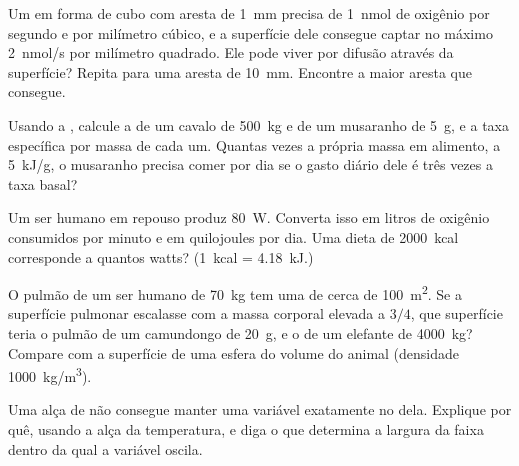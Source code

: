 \begin{exercise}[$\star\star$]\label{exo:b1:organism-environment:5}
Um  em forma de cubo com aresta de \qty{1}{mm} precisa de
\qty{1}{nmol} de oxigênio por segundo e por milímetro cúbico, e a
superfície dele consegue captar no máximo \qty{2}{nmol/s} por milímetro
quadrado. Ele pode viver por difusão através da superfície? Repita para
uma aresta de \qty{10}{mm}. Encontre a maior aresta que consegue.
\end{exercise}

\begin{exercise}[$\star\star$]\label{exo:b1:organism-environment:6}
Usando a , calcule a  de um cavalo de
\qty{500}{kg} e de um musaranho de \qty{5}{g}, e a taxa específica por
massa de cada um. Quantas vezes a própria massa em alimento, a
\qty{5}{kJ/g}, o musaranho precisa comer por dia se o gasto diário dele
é três vezes a taxa basal?
\end{exercise}

\begin{exercise}[$\star\star$]\label{exo:b1:organism-environment:7}
Um ser humano em repouso produz \qty{80}{W}. Converta isso em litros de
oxigênio consumidos por minuto e em quilojoules por dia. Uma dieta de
\qty{2000}{kcal} corresponde a quantos watts? (\qty{1}{kcal} =
\qty{4.18}{kJ}.)
\end{exercise}

\begin{exercise}[$\star\star$]\label{exo:b1:organism-environment:8}
O pulmão de um ser humano de \qty{70}{kg} tem uma 
de cerca de \qty{100}{m^2}. Se a superfície pulmonar escalasse com a
massa corporal elevada a $3/4$, que superfície teria o pulmão de um
camundongo de \qty{20}{g}, e o de um elefante de \qty{4000}{kg}?
Compare com a superfície de uma esfera do volume do animal (densidade
\qty{1000}{kg/m^3}).
\end{exercise}

\begin{exercise}[$\star\star$]\label{exo:b1:organism-environment:9}
Uma alça de  não consegue manter uma variável
exatamente no  dela. Explique por quê, usando a alça
da temperatura, e diga o que determina a largura da faixa dentro da qual
a variável oscila.
\end{exercise}

